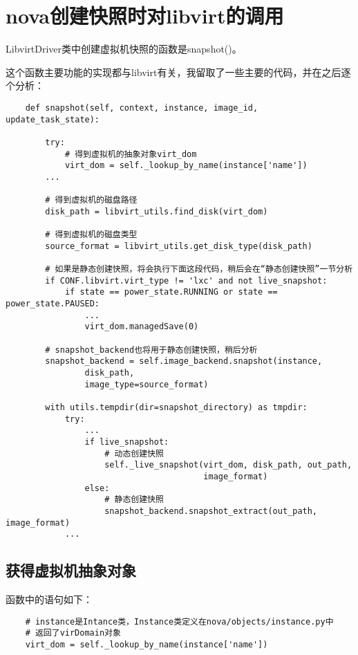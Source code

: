 \documentclass[a4paper,left=1.5cm,right=1.5cm,11pt]{article}
\begin{document}
\clearpage

\section{nova创建快照时对libvirt的调用}
	LibvirtDriver类中创建虚拟机快照的函数是snapshot()。\par

	这个函数主要功能的实现都与libvirt有关，我留取了一些主要的代码，并在之后逐个分析：
	\begin{lstlisting}
	def snapshot(self, context, instance, image_id, update_task_state):

        try:
			# 得到虚拟机的抽象对象virt_dom
            virt_dom = self._lookup_by_name(instance['name'])
        ...

		# 得到虚拟机的磁盘路径
        disk_path = libvirt_utils.find_disk(virt_dom)

		# 得到虚拟机的磁盘类型
        source_format = libvirt_utils.get_disk_type(disk_path)

		# 如果是静态创建快照，将会执行下面这段代码，稍后会在“静态创建快照”一节分析
		if CONF.libvirt.virt_type != 'lxc' and not live_snapshot:
            if state == power_state.RUNNING or state == power_state.PAUSED:
                ...
                virt_dom.managedSave(0)

		# snapshot_backend也将用于静态创建快照，稍后分析
        snapshot_backend = self.image_backend.snapshot(instance,
                disk_path,
                image_type=source_format)

        with utils.tempdir(dir=snapshot_directory) as tmpdir:
            try:
				...
                if live_snapshot:
					# 动态创建快照
                    self._live_snapshot(virt_dom, disk_path, out_path,
                                        image_format)
                else:
					# 静态创建快照
                    snapshot_backend.snapshot_extract(out_path, image_format)
            ...
	\end{lstlisting}

\clearpage

\subsection{获得虚拟机抽象对象}
	函数中的语句如下：
	\begin{lstlisting}
	# instance是Intance类，Instance类定义在nova/objects/instance.py中
	# 返回了virDomain对象
	virt_dom = self._lookup_by_name(instance['name'])
	\end{lstlisting}
\end{document}
